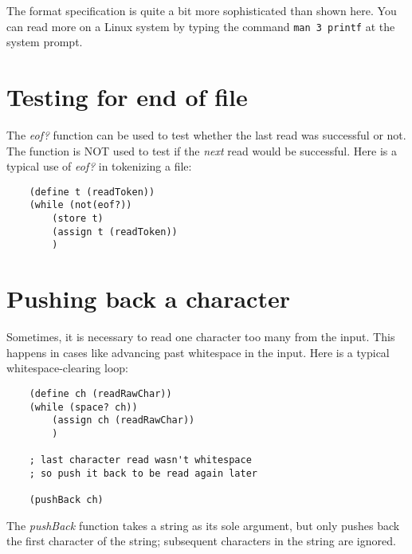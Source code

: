 The format specification is quite a bit more sophisticated
than shown here. You can read more on a Linux system by
typing the command \verb!man 3 printf! at the system prompt.

\section{Testing for end of file}

The {\it eof?} function can be used to test whether the last
read was successful or not. The function is NOT used to
test if the {\it next} read would be successful. Here is a typical
use of {\it eof?} in tokenizing a file:

\begin{verbatim}
    (define t (readToken))
    (while (not(eof?))
        (store t)
        (assign t (readToken))
        )
\end{verbatim}

\section{Pushing back a character}

Sometimes, it is necessary to read one character too
many from the input. This happens in cases like
advancing past whitespace in the input.
Here is a typical whitespace-clearing loop:

\begin{verbatim}
    (define ch (readRawChar))
    (while (space? ch))
        (assign ch (readRawChar))
        )

    ; last character read wasn't whitespace
    ; so push it back to be read again later

    (pushBack ch)
\end{verbatim}

The {\it pushBack} function takes a string as its
sole argument, but only pushes back the first
character of the string; subsequent characters in
the string are ignored.
